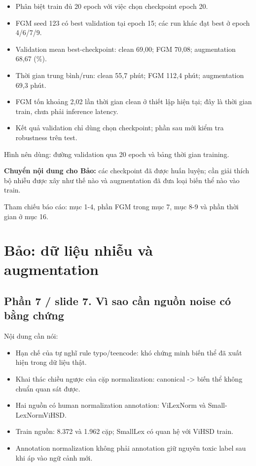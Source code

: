 \documentclass[11pt,a4paper]{article}
\begin{document}
\begin{itemize}

\item Phân biệt train đủ 20 epoch với việc chọn checkpoint epoch 20.

\item FGM seed 123 có best validation tại epoch 15; các run khác đạt best ở epoch 4/6/7/9.

\item Validation mean best-checkpoint: clean 69,00; FGM 70,08; augmentation 68,67 (\%).

\item Thời gian trung bình/run: clean 55,7 phút; FGM 112,4 phút; augmentation 69,3 phút.

\item FGM tốn khoảng 2,02 lần thời gian clean ở thiết lập hiện tại; đây là thời gian train, chưa phải inference latency.

\item Kết quả validation chỉ dùng chọn checkpoint; phần sau mới kiểm tra robustness trên test.

\end{itemize}

Hình nên dùng: đường validation qua 20 epoch và bảng thời gian training.


\textbf{Chuyển nội dung cho Bảo:} các checkpoint đã được huấn luyện; cần giải thích bộ nhiễu được xây như thế nào và augmentation đã đưa loại biến thể nào vào train.


Tham chiếu báo cáo: mục 1-4, phần FGM trong mục 7, mục 8-9 và phần thời gian ở mục 16.


\FloatBarrier\section{Bảo: dữ liệu nhiễu và augmentation}

\subsection*{Phần 7 / slide 7. Vì sao cần nguồn noise có bằng chứng}

Nội dung cần nói:


\begin{itemize}

\item Hạn chế của tự nghĩ rule typo/teencode: khó chứng minh biến thể đã xuất hiện trong dữ liệu thật.

\item Khai thác chiều ngược của cặp normalization: canonical -> biến thể không chuẩn quan sát được.

\item Hai nguồn có human normalization annotation: ViLexNorm và Small-LexNormViHSD.

\item Train nguồn: 8.372 và 1.962 cặp; SmallLex có quan hệ với ViHSD train.

\item Annotation normalization không phải annotation giữ nguyên toxic label sau khi áp vào ngữ cảnh mới.

\end{itemize}
\end{document}

